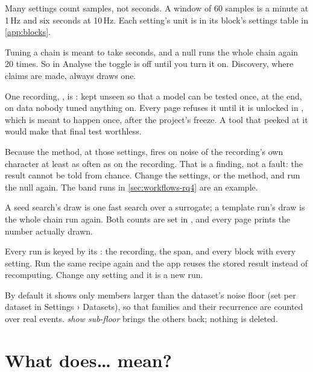 Many settings count samples, not seconds. A window of 60 samples is a minute at 1\,Hz and six
seconds at 10\,Hz. Each setting's unit is in its block's settings table in \cref{app:blocks}.

Tuning a chain is meant to take seconds, and a null runs the whole chain again 20 times. So
in Analyse the  toggle is off until you turn it on. Discovery, where claims
are made, always draws one.

One recording, , is : kept unseen so that
a model can be tested once, at the end, on data nobody tuned anything on. Every page refuses it
until it is unlocked in , which is meant to happen once, after the
project's freeze. A tool that peeked at it would make that final test worthless.

Because the method, at those settings, fires on noise of the recording's own character at
least as often as on the recording. That is a finding, not a fault: the result cannot be told
from chance. Change the settings, or the method, and run the null again. The band runs in
\cref{sec:workflows-rq4} are an example.

A seed search's draw is one fast search over a surrogate; a template run's draw is the whole
chain run again. Both counts are set in , and every page prints the
number actually drawn.

Every run is keyed by its : the recording, the span, and every block with
every setting. Run the same recipe again and the app reuses the stored result instead of
recomputing. Change any setting and it is a new run.

By default it shows only members larger than the dataset's noise floor (set per dataset in
Settings › Datasets), so that families and their recurrence are counted over real events.
\emph{show sub-floor} brings the others back; nothing is deleted.

\section{What does\ldots{} mean?}\label{sec:faq-what}

